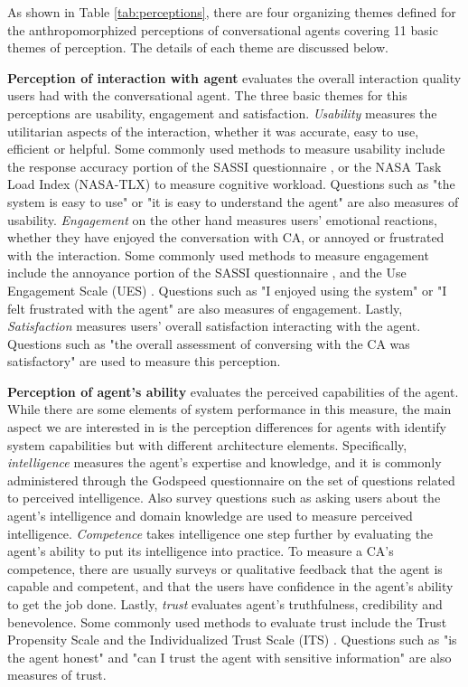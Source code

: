 \documentclass[sigconf,screen,review, anonymous]{acmart}
\newcommand{\cmt}[1]{}%
\begin{document}
As shown in Table \ref{tab:perceptions}, there are four organizing themes defined for the anthropomorphized perceptions of conversational agents covering 11 basic themes of perception. The details of each theme are discussed below.

\textbf{Perception of interaction with agent} evaluates the overall interaction quality users had with the conversational agent. The three basic themes for this perceptions are usability, engagement and satisfaction. \textit{Usability} measures the utilitarian aspects of the interaction, whether it was accurate, easy to use, efficient or helpful. Some commonly used methods to measure usability include the response accuracy portion of the SASSI questionnaire \cite{hone2000towards}\cmt{sassi}, or the NASA Task Load Index (NASA-TLX) \cite{hart1988development}\cmt{nasa} to measure cognitive workload. Questions such as "the system is easy to use" or "it is easy to understand the agent" are also measures of usability. \textit{Engagement} on the other hand measures users' emotional reactions, whether they have enjoyed the conversation with CA, or annoyed or frustrated with the interaction. Some commonly used methods to measure engagement include  the annoyance portion of the SASSI questionnaire \cite{hone2000towards}\cmt{sassi}, and the Use Engagement Scale (UES) \cite{o2018practical}\cmt{ues}. Questions such as "I enjoyed using the system" or "I felt frustrated with the agent" are also measures of engagement. Lastly, \textit{Satisfaction} measures users' overall satisfaction interacting with the agent. Questions such as "the overall assessment of conversing with the CA was satisfactory" are used to measure this perception.

\textbf{Perception of agent's ability} evaluates the perceived capabilities of the agent. While there are some elements of system performance in this measure, the main aspect we are interested in is the perception differences for agents with identify system capabilities but with different architecture elements. Specifically, \textit{intelligence} measures the agent's expertise and knowledge, and it is commonly administered through the Godspeed questionnaire \cite{bartneck2009measurement}\cmt{godspeed} on the set of questions related to perceived intelligence. Also survey questions such as asking users about the agent's intelligence and domain knowledge are used to measure perceived intelligence. \textit{Competence} takes intelligence one step further by evaluating the agent's ability to put its intelligence into practice. To measure a CA's competence, there are usually surveys or qualitative feedback that the agent is capable and competent, and that the users have confidence in the agent's ability to get the job done. Lastly, \textit{trust} evaluates agent's truthfulness, credibility and benevolence. Some commonly used methods to evaluate trust include the Trust Propensity Scale \cite{mayer1999effect} and the Individualized Trust Scale (ITS) \cite{wheeless1977measurement}. Questions such as "is the agent honest" and "can I trust the agent with sensitive information" are also measures of trust.
\end{document}
